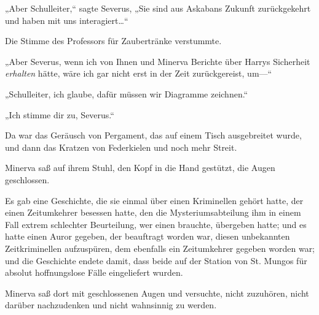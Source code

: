 „Aber Schulleiter,“ sagte Severus, „Sie sind aus Askabans Zukunft zurückgekehrt und haben mit uns interagiert…“

Die Stimme des Professors für Zaubertränke verstummte.

„Aber Severus, wenn ich von Ihnen und Minerva Berichte über Harrys Sicherheit \emph{erhalten} hätte, wäre ich gar nicht erst in der Zeit zurückgereist, um—“

„Schulleiter, ich glaube, dafür müssen wir Diagramme zeichnen.“

„Ich stimme dir zu, Severus.“

Da war das Geräusch von Pergament, das auf einem Tisch ausgebreitet wurde, und dann das Kratzen von Federkielen und noch mehr Streit.

Minerva saß auf ihrem Stuhl, den Kopf in die Hand gestützt, die Augen geschlossen.

Es gab eine Geschichte, die sie einmal über einen Kriminellen gehört hatte, der einen Zeitumkehrer besessen hatte, den die Mysteriumsabteilung ihm in einem Fall extrem schlechter Beurteilung, wer einen brauchte, übergeben hatte; und es hatte einen Auror gegeben, der beauftragt worden war, diesen unbekannten Zeitkriminellen aufzuspüren, dem ebenfalls ein Zeitumkehrer gegeben worden war; und die Geschichte endete damit, dass beide auf der Station von St. Mungos für absolut hoffnungslose Fälle eingeliefert wurden.

Minerva saß dort mit geschlossenen Augen und versuchte, nicht zuzuhören, nicht darüber nachzudenken und nicht wahnsinnig zu werden.

